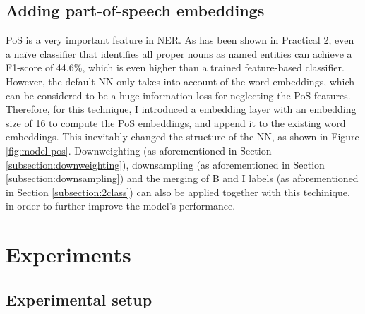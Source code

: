 \documentclass[11pt,a4paper]{article}
\begin{document}
\subsection{Adding part-of-speech embeddings} \label{subsection:PoS}

PoS is a very important feature in NER. As has been shown in Practical 2, even a na\"{i}ve classifier that identifies all proper nouns as named entities can achieve a F1-score of 44.6\%, which is even higher than a trained feature-based classifier. However, the default NN only takes into account of the word embeddings, which can be considered to be a huge information loss for neglecting the PoS features. Therefore, for this technique, I introduced a embedding layer with an embedding size of 16 to compute the PoS embeddings, and append it to the existing word embeddings. This inevitably changed the structure of the NN, as shown in Figure \ref{fig:model-pos}. Downweighting (as aforementioned in Section \ref{subsection:downweighting}), downsampling (as aforementioned in Section \ref{subsection:downsampling}) and the merging of B and I labels (as aforementioned in Section \ref{subsection:2class}) can also be applied together with this techinique, in order to further improve the model's performance. 

\section{Experiments}

\subsection{Experimental setup}
\end{document}
